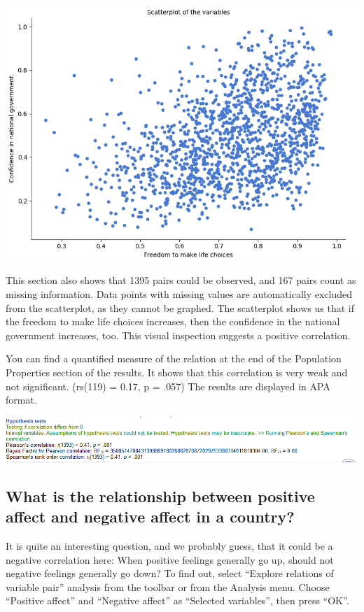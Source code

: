 \documentclass[
]{book}
\begin{document}
\includegraphics{img/ch3/vpscatter.png}

This section also shows that 1395 pairs could be observed, and 167 pairs count as missing information. Data points with missing values are automatically excluded from the scatterplot, as they cannot be graphed. The scatterplot shows us that if the freedom to make life choices increases, then the confidence in the national government increases, too. This visual inspection suggests a positive correlation.

You can find a quantified measure of the relation at the end of the Population Properties section of the results. It shows that this correlation is very weak and not significant. (rs(119) = 0.17, p = .057) The results are displayed in APA format.

\includegraphics{img/ch3/corrhip.png}

\hypertarget{what-is-the-relationship-between-positive-affect-and-negative-affect-in-a-country}{%
\subsection{What is the relationship between positive affect and negative affect in a country?}\label{what-is-the-relationship-between-positive-affect-and-negative-affect-in-a-country}}

It is quite an interesting question, and we probably guess, that it could be a negative correlation here: When positive feelings generally go up, should not negative feelings generally go down? To find out, select ``Explore relations of variable pair'' analysis from the toolbar or from the Analysis menu. Choose ``Positive affect'' and ``Negative affect'' as ``Selected variables'', then press ``OK''.
\end{document}
